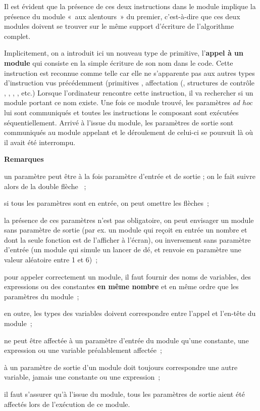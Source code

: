 	Il est évident que la présence 
	de ces deux instructions dans le module 
	implique la présence du module 
	«~aux alentours~» du premier, 
	c’est-à-dire que ces deux modules doivent
	se trouver sur le même support d’écriture de
	l’algorithme complet.

	Implicitement, 
	on a introduit ici un nouveau type de primitive, 
	l’\textbf{appel à un module}
	qui consiste en la simple écriture de son
	nom dans le code. 
	Cette instruction est reconnue comme telle 
	car elle ne s’apparente pas aux autres types d’instruction 
	vus précédemment 
	(primitives , 
	affectation (\pseudocode{\Gets}, 
	structures de contrôle
	, ,
	, , etc.) 
	Lorsque l’ordinateur rencontre cette instruction, 
	il va rechercher si un module portant ce nom existe. 
	Une fois ce module trouvé, les paramètres \textit{ad hoc} 
	lui sont communiqués et toutes les instructions le composant 
	sont exécutées séquentiellement. 
	Arrivé à l’issue du module, 
	les paramètres de sortie sont communiqués au module appelant 
	et le déroulement de celui-ci se poursuit là où il avait été
	interrompu.

	{\bfseries Remarques}

	\begin{liste}
	\item
		un paramètre peut être à la fois paramètre d’entrée et de sortie ; 
		on le fait suivre alors de la double flèche \pseudocode{\InOut}~;
	\item
		si tous les paramètres sont en entrée, 
		on peut omettre les flèches~;
	\item
		la présence de ces paramètres n’est pas obligatoire, 
		on peut envisager un module sans paramètre de sortie 
		(par ex. un module qui reçoit en entrée un nombre 
		et dont la seule fonction est de l’afficher à l’écran), 
		ou inversement sans paramètre d’entrée 
		(un module qui simule un lancer de dé, 
		et renvoie en paramètre une valeur aléatoire entre 1 et 6)~;
	\item
		pour appeler correctement un module, 
		il faut fournir des noms de variables, 
		des expressions ou des constantes \textbf{en même nombre} 
		et en même ordre que les paramètres du module~;
	\item
		en outre, les types des variables doivent correspondre 
		entre l’appel et l’en-tête du module~;
	\item
		ne peut être affectée à un paramètre d’entrée du module 
		qu’une constante, une expression 
		ou une variable préalablement affectée~;
	\item 
		à un paramètre de sortie d’un module 
		doit toujours correspondre une autre variable, 
		jamais une constante ou une expression~;
	\item
		il faut s’assurer qu’à l’issue du module, 
		tous les paramètres de sortie aient été affectés 
		lors de l’exécution de ce module.
	\end{liste}

